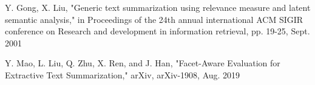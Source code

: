 \documentclass[conference]{IEEEtran}
\begin{document}
\begin{thebibliography}{00}
 Y. Gong, X. Liu, "Generic text summarization using relevance measure and latent semantic analysis," in Proceedings of the 24th annual international ACM SIGIR conference on Research and development in information retrieval, pp. 19-25, Sept. 2001

 Y. Mao, L. Liu, Q. Zhu, X. Ren, and J. Han, "Facet-Aware Evaluation for Extractive Text Summarization," arXiv, arXiv-1908, Aug. 2019







\end{thebibliography}
\end{document}
